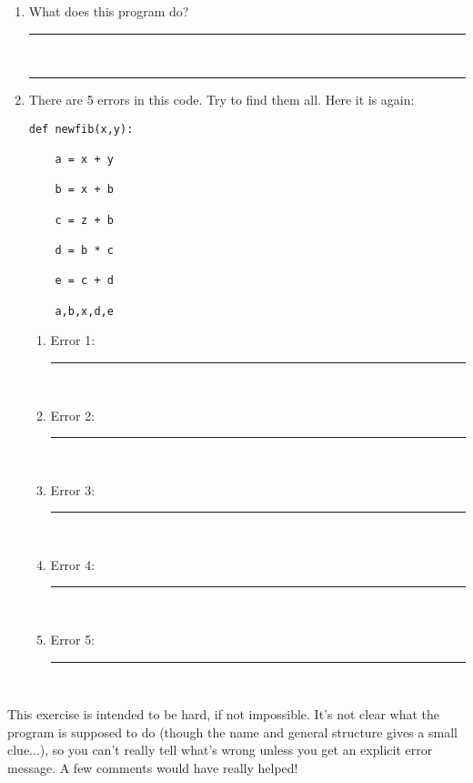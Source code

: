 \documentclass[paper=a4, fontsize=11pt]{scrartcl} %
\numberwithin{equation}{section} %
\numberwithin{figure}{section} %
\numberwithin{table}{section} %
\begin{document}
\begin{enumerate}

\item What does this program do? \rule{9cm}{0.15mm}\\

\rule{13.5cm}{0.15mm}



\pagebreak

\item There are 5 errors in this code.  Try to find them all.  Here it is again:
\begin{framed}
\begin{lstlisting}
def newfib(x,y):

    a = x + y

    b = x + b

    c = z + b

    d = b * c

    e = c + d

    a,b,x,d,e
\end{lstlisting}
\end{framed}

\begin{enumerate}

\item Error 1:\rule{11cm}{0.15mm}\\

\item Error 2:\rule{11cm}{0.15mm}\\

\item Error 3:\rule{11cm}{0.15mm}\\

\item Error 4:\rule{11cm}{0.15mm}\\

\item Error 5:\rule{11cm}{0.15mm}\\

\end{enumerate}

\end{enumerate}

This exercise is intended to be hard, if not impossible.  It's not clear what the program is supposed to do (though the name and general structure gives a small clue...), so you can't really tell what's wrong unless you get an explicit error message.  A few comments would have really helped!


\pagebreak
\end{document}
